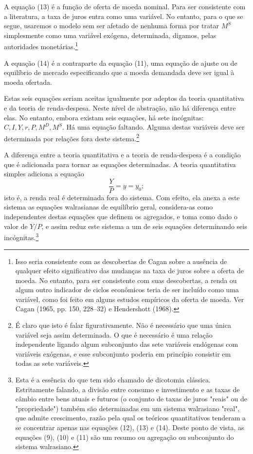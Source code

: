 \documentclass[12pt]{article}
\begin{document}
A equação (13) é a função de oferta de moeda nominal. Para ser consistente com a literatura, a taxa de juros entra como uma variável. No entanto, para o que se segue, usaremos o modelo sem ser afetado de nenhuma forma por tratar $M^S$ simplesmente como uma variável exógena, determinada, digamos, pelas autoridades monetárias.\footnote{Isso seria consistente com as descobertas de Cagan sobre a ausência de qualquer efeito significativo das mudanças na taxa de juros sobre a oferta de moeda. No entanto, para ser consistente com suas descobertas, a renda ou algum outro indicador de ciclos econômicos teria de ser incluído como uma variável, como foi feito em alguns estudos empíricos da oferta de moeda. Ver Cagan (1965, pp. 150, 228–32) e Hendershott (1968).}

A equação (14) é a contraparte da equação (11), uma equação de ajuste ou de equilíbrio de mercado especificando que a moeda demandada deve ser igual à moeda ofertada.

Estas seis equações seriam aceitas igualmente por adeptos da teoria quantitativa e da teoria de renda-despesa. Neste nível de abstração, não há diferença entre elas. No entanto, embora existam seis equações, há sete incógnitas: $C, I, Y, r, P, M^D, M^S$. Há uma equação faltando. Alguma destas variáveis deve ser determinada por relações fora deste sistema.\footnote{É claro que isto é falar figurativamente. Não é necessário que uma única variável seja assim determinada. O que é necessário é uma relação independente ligando algum subconjunto das sete variáveis endógenas com variáveis exógenas, e esse subconjunto poderia em princípio consistir em todas as sete variáveis.}

A diferença entre a teoria quantitativa e a teoria de renda-despesa é a condição que é adicionada para tornar as equações determinadas. A teoria quantitativa simples adiciona a equação
\begin{equation}
\frac{Y}{P} = y = y_0;
\end{equation}
isto é, a renda real é determinada fora do sistema. Com efeito, ela anexa a este sistema as equações walrasianas de equilíbrio geral, considera-as como independentes destas equações que definem os agregados, e toma como dado o valor de $Y/P$, e assim reduz este sistema a um de seis equações determinando seis incógnitas.\footnote{Esta é a essência do que tem sido chamado de dicotomia clássica. Estritamente falando, a divisão entre consumo e investimento e as taxas de câmbio entre bens atuais e futuros (o conjunto de taxas de juros "reais" ou de "propriedade") também são determinadas em um sistema walrasiano "real", que admite crescimento, razão pela qual os teóricos quantitativos tenderam a se concentrar apenas nas equações (12), (13) e (14). Deste ponto de vista, as equações (9), (10) e (11) são um resumo ou agregação ou subconjunto do sistema walrasiano.}
\end{document}
